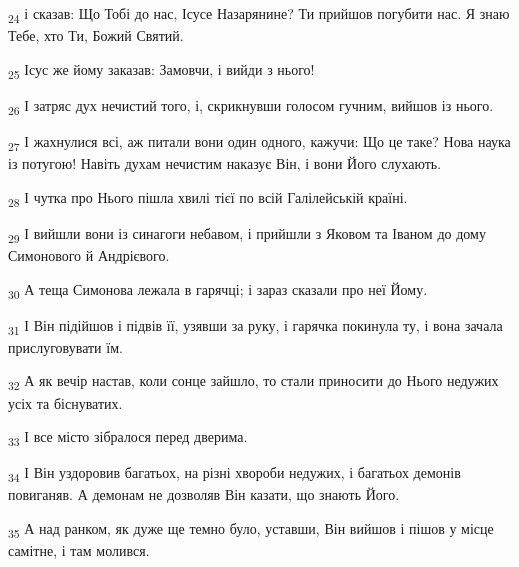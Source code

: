 \begin{tcolorbox}
\textsubscript{24} і сказав: Що Тобі до нас, Ісусе Назарянине? Ти прийшов погубити нас. Я знаю Тебе, хто Ти, Божий Святий.
\end{tcolorbox}
\begin{tcolorbox}
\textsubscript{25} Ісус же йому заказав: Замовчи, і вийди з нього!
\end{tcolorbox}
\begin{tcolorbox}
\textsubscript{26} І затряс дух нечистий того, і, скрикнувши голосом гучним, вийшов із нього.
\end{tcolorbox}
\begin{tcolorbox}
\textsubscript{27} І жахнулися всі, аж питали вони один одного, кажучи: Що це таке? Нова наука із потугою! Навіть духам нечистим наказує Він, і вони Його слухають.
\end{tcolorbox}
\begin{tcolorbox}
\textsubscript{28} І чутка про Нього пішла хвилі тієї по всій Галілейській країні.
\end{tcolorbox}
\begin{tcolorbox}
\textsubscript{29} І вийшли вони із синагоги небавом, і прийшли з Яковом та Іваном до дому Симонового й Андрієвого.
\end{tcolorbox}
\begin{tcolorbox}
\textsubscript{30} А теща Симонова лежала в гарячці; і зараз сказали про неї Йому.
\end{tcolorbox}
\begin{tcolorbox}
\textsubscript{31} І Він підійшов і підвів її, узявши за руку, і гарячка покинула ту, і вона зачала прислуговувати їм.
\end{tcolorbox}
\begin{tcolorbox}
\textsubscript{32} А як вечір настав, коли сонце зайшло, то стали приносити до Нього недужих усіх та біснуватих.
\end{tcolorbox}
\begin{tcolorbox}
\textsubscript{33} І все місто зібралося перед дверима.
\end{tcolorbox}
\begin{tcolorbox}
\textsubscript{34} І Він уздоровив багатьох, на різні хвороби недужих, і багатьох демонів повиганяв. А демонам не дозволяв Він казати, що знають Його.
\end{tcolorbox}
\begin{tcolorbox}
\textsubscript{35} А над ранком, як дуже ще темно було, уставши, Він вийшов і пішов у місце самітне, і там молився.
\end{tcolorbox}
